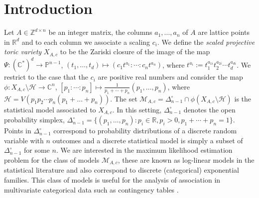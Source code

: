 \documentclass[12pt,reqno]{amsart}   	%
\theoremstyle{plain}
\theoremstyle{definition}
\theoremstyle{remark}
\newcommand{\HH}{\mathcal{H}}
\newcommand{\MM}{\mathcal{M}}
\newcommand{\Z}{\mathbb{Z}}
\newcommand{\R}{\mathbb{R}}
\newcommand{\C}{\mathbb{C}}
\newcommand{\pp}{\mathbb{P}}
\begin{document}
\section{Introduction}
Let $A\in \Z^{d\times n}$ be an integer matrix, the columns $a_1,\ldots,a_n$ of $A$ are lattice points in $\R^d$ and to each column we associate 
a scaling $c_i$. We define the \emph{scaled projective toric variety} $X_{A,c}$ to be the Zariski closure of the image of the
map $\Psi: (\C^{\ast})^d\to \pp^{n-1}$, $(t_1,\ldots,t_d)\mapsto (c_1t^{a_1}:\cdots:c_nt^{a_n})$, where $t^{a_i}:=t_1^{a_{1i}}t_2^{a_{2i}}\cdots t_d^{a_{di}}$.
We restrict to the case that the $c_i$ are positive real numbers and consider the map $\phi: X_{A,c}\setminus \HH \to \C^n$, $[p_1:\cdots:p_n]\mapsto \frac{1}{p_1+\cdots+p_n}(p_1,\ldots,p_n)$, where $\mathcal{H}=V(p_1p_2\cdots p_n(p_1+\ldots+p_n))$. The set $\MM_{A,c}=\Delta_{n-1}^{\circ}\cap \phi(X_{A,c}\setminus \HH)$
is the statistical model associated to $X_{A,c}$. In this setting, $\Delta_{n-1}^{\circ}$ denotes the open probability simplex, $\Delta_{n-1}^{\circ}=\{(p_1,\ldots,p_n):p_i\in \R, p_i>0, p_1+\cdots+p_n=1\}$. Points in $\Delta_{n-1}^{\circ}$ correspond to probability distributions of a discrete random variable with $n$ outcomes and a discrete
statistical model is simply a subset of $\Delta_{n-1}^{\circ}$ for some $n$. We are interested in the maximum likelihood estimation problem
for the class of models $\MM_{A,c}$, these are known as log-linear models in the statistical literature and also correspond to discrete (categorical) exponential
families. This class of models  is useful for the analysis of association in multivariate categorical data such as contingency tables \cite{bishop2007}.
\end{document}
